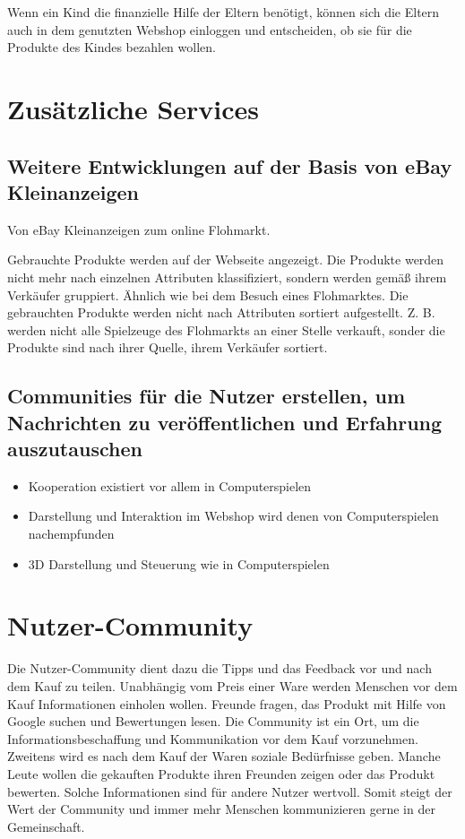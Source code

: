 Wenn ein Kind die finanzielle Hilfe der Eltern benötigt, können sich die Eltern auch in dem genutzten Webshop einloggen und entscheiden, ob sie für die Produkte des Kindes bezahlen wollen.


\section{Zusätzliche Services}


\subsection{Weitere Entwicklungen auf der Basis von eBay Kleinanzeigen}

Von eBay Kleinanzeigen zum online Flohmarkt.

Gebrauchte Produkte werden auf der Webseite angezeigt. Die Produkte werden nicht mehr nach einzelnen Attributen klassifiziert, sondern werden gemäß ihrem Verkäufer gruppiert. Ähnlich wie bei dem Besuch eines Flohmarktes. Die gebrauchten Produkte werden nicht nach Attributen sortiert aufgestellt. Z. B. werden nicht alle Spielzeuge des Flohmarkts an einer Stelle verkauft, sonder die Produkte sind nach ihrer Quelle, ihrem Verkäufer sortiert.


\subsection{Communities  für die Nutzer erstellen, um Nachrichten zu veröffentlichen und Erfahrung auszutauschen}

\begin{itemize}
\item Kooperation existiert vor allem in Computerspielen
\item Darstellung und Interaktion im Webshop wird denen von Computerspielen nachempfunden
\item 3D Darstellung und Steuerung wie in Computerspielen
\end{itemize}


\section{Nutzer-Community}

Die Nutzer-Community dient dazu die Tipps und das Feedback vor und nach dem Kauf zu teilen. Unabhängig vom Preis einer Ware werden Menschen vor dem Kauf Informationen einholen wollen. Freunde fragen, das Produkt mit Hilfe von Google suchen und Bewertungen lesen. Die Community ist ein Ort, um die Informationsbeschaffung und Kommunikation vor dem Kauf vorzunehmen. Zweitens wird es nach dem Kauf der Waren soziale Bedürfnisse geben. Manche Leute wollen die gekauften Produkte ihren Freunden zeigen oder das Produkt bewerten. Solche Informationen sind für andere Nutzer wertvoll. Somit steigt der Wert der Community und immer mehr Menschen kommunizieren gerne in der Gemeinschaft.


